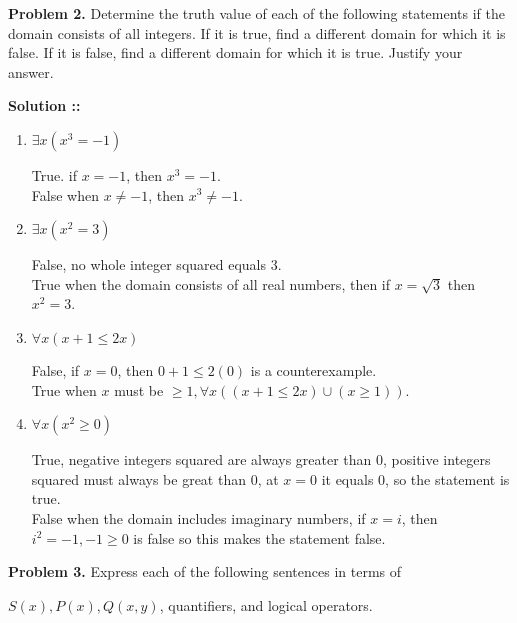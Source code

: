 \documentclass[11pt]{article}
\begin{document}

\textbf{Problem 2.} Determine the truth value of each of the following statements if 
the domain consists of all integers. If it is true, find a different domain for which 
it is false. If it is false, find a different domain for which it is true. Justify 
your answer.

\vspace{5px}\textbf{Solution ::}
\begin{enumerate}[label=2.\arabic* ::]
\item 
$\exists x(x^3=-1)$

True. if $x=-1$, then $x^3=-1$. \\
False when $x\ne -1$, then $x^3\ne-1$.

\item
$\exists x(x^2=3)$

False, no whole integer squared equals 3. \\
True when the domain consists of all real numbers, then if $x=\sqrt{3}$
then $x^2=3$.

\item
$\forall x(x+1\le 2x)$

False, if $x=0$, then $0+1\le 2(0)$ is a counterexample. \\
True when $x$ must be $\ge 1, \forall x((x+1\le 2x) \cup (x\ge 1))$.

\item
$\forall x(x^2\ge 0)$

True, negative integers squared are always greater than 0, positive integers squared
must always be great than 0, at $x=0$ it equals 0, so the statement is true. \\
False when the domain includes imaginary numbers, if $x=i$, then $i^2=-1,-1\ge 0$ is
false so this makes the statement false.
\end{enumerate}
\pagebreak


\textbf{Problem 3.} Express each of the following sentences in terms of

$S(x), P(x), Q(x,y)$, quantifiers, and logical operators.
\end{document}
